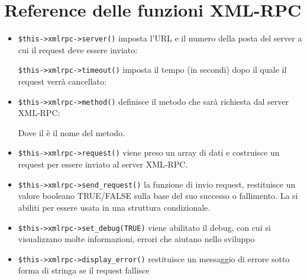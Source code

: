 \section*{Reference delle funzioni XML-RPC}
\begin{itemize}
\item \verb|$this->xmlrpc->server()| imposta l'URL e il numero della posta del server a cui il request deve essere inviato:


\verb|$this->xmlrpc->timeout()| imposta il tempo (in secondi) dopo il quale il request verrà cancellato:


\item \verb|$this->xmlrpc->method()| definisce il metodo che sarà richiesta dal server XML-RPC:


Dove il  è il nome del metodo.

\item \verb|$this->xmlrpc->request()| viene preso un array di dati e costruisce un request per essere inviato al server XML-RPC.


\item \verb|$this->xmlrpc->send_request()| la funzione di invio request, restituisce un valore booleano TRUE/FALSE sulla base del suo successo o fallimento. La si abiliti per essere usata in una struttura condizionale.

\item \verb|$this->xmlrpc->set_debug(TRUE)| viene abilitato il debug, con cui si visualizzano molte informazioni, errori che aiutano nello sviluppo

\item \verb|$this->xmlrpc->display_error()| restituisce un messaggio di errore sotto forma di stringa se il request fallisce


\end{itemize}
